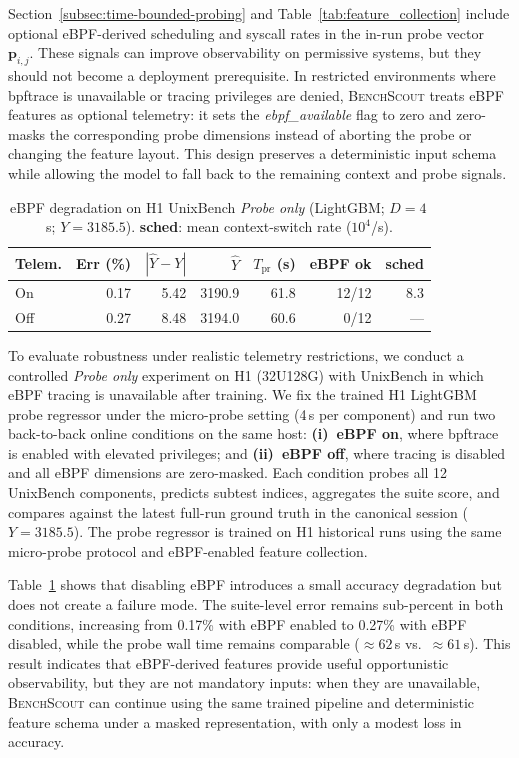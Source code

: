 \documentclass[sigplan,10pt]{acmart}
\newcommand{\ourmethod}{\textsc{BenchScout}\xspace}
\newcommand{\id}[1]{{\itshape #1}}
\begin{document}
Section~\ref{subsec:time-bounded-probing} and Table~\ref{tab:feature_collection} include optional eBPF-derived scheduling and syscall rates in the in-run probe vector~\(\mathbf{p}_{i,j}\).
These signals can improve observability on permissive systems, but they should not become a deployment prerequisite.
In restricted environments where bpftrace is unavailable or tracing privileges are denied, \ourmethod{} treats eBPF features as optional telemetry: it sets the \id{ebpf\_available} flag to zero and zero-masks the corresponding probe dimensions instead of aborting the probe or changing the feature layout.
This design preserves a deterministic input schema while allowing the model to fall back to the remaining context and probe signals.
\begin{table}[t]
\centering
\caption{eBPF degradation on H1 UnixBench \emph{Probe only} (LightGBM; $D{=}4$\,s; $Y{=}3185.5$). \textbf{sched}: mean context-switch rate ($10^4$/s).}
\label{tab:probe-ebpf-ablation}
\small
\begin{tabular*}{\columnwidth}{@{\extracolsep{\fill}}lrrrrrr@{}}
\toprule
\textbf{Telem.} & \textbf{Err (\%)} & $|\hat{Y}{-}Y|$ & $\hat{Y}$ & $T_{\mathrm{pr}}$ (s) & \textbf{eBPF ok} & \textbf{sched} \\
\midrule
On  & 0.17 & 5.42  & 3190.9& 61.8 & 12/12 & 8.3 \\
Off & 0.27 & 8.48&  3194.0 & 60.6 & 0/12 & --- \\
\bottomrule
\end{tabular*}
\end{table}

To evaluate robustness under realistic telemetry restrictions, we conduct a controlled \emph{Probe only} experiment on H1 (32U128G) with UnixBench in which eBPF tracing is unavailable after training. We fix the trained H1 LightGBM probe regressor under the micro-probe setting (4\,s per component) and run two back-to-back online conditions on the same host:
\textbf{(i)~eBPF on}, where bpftrace is enabled with elevated privileges; and
\textbf{(ii)~eBPF off}, where tracing is disabled and all eBPF dimensions are zero-masked.
Each condition probes all 12 UnixBench components, predicts subtest indices, aggregates the suite score, and compares against the latest full-run ground truth in the canonical session (\(Y=3185.5\)).
The probe regressor is trained on H1 historical runs using the same micro-probe protocol and eBPF-enabled feature collection.

Table~\ref{tab:probe-ebpf-ablation} shows that disabling eBPF introduces a small accuracy degradation but does not create a failure mode.
The suite-level error remains sub-percent in both conditions, increasing from 0.17\% with eBPF enabled to 0.27\% with eBPF disabled, while the probe wall time remains comparable (\(\approx62\)\,s vs.\ \(\approx61\)\,s).
This result indicates that eBPF-derived features provide useful opportunistic observability, but they are not mandatory inputs: when they are unavailable, \ourmethod{} can continue using the same trained pipeline and deterministic feature schema under a masked representation, with only a modest loss in accuracy.
\end{document}
